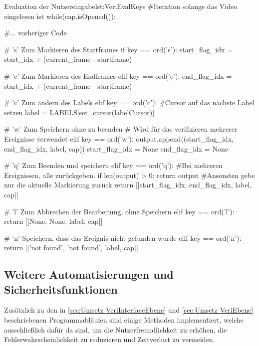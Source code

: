\begin{pythoncode}{Evaluation der Nutzereingabe}{lst:VeriEvalKeys}
#Iteration solange das Video eingelesen ist
while(cap.isOpened()):

     #... vorheriger Code
     
    # 's' Zum Markieren des Startframes
    if key == ord('s'):
        start_flag_idx = start_idx + (current_frame - startframe)
    
    # 'e' Zum Markieren des Endframes
    elif key == ord('e'):
        end_flag_idx = start_idx + (current_frame - startframe)
    
    # 'c' Zum ändern des Labels
    elif key == ord('c'):
        #Cursor auf das nächste Label setzen
        label = LABELS[set_cursor(labelCursor)]

    # 'w' Zum Speichern ohne zu beenden
    # Wird für das verifizieren mehrerer Ereignisse verwendet
    elif key == ord('w'):
        output.append((start_flag_idx, end_flag_idx, label, cap))
        start_flag_idx = None
        end_flag_idx = None
    
    # 'q' Zum Beenden und speichern
    elif key == ord('q'):
        #Bei mehreren Ereignissen, alle zurückgeben.
        if len(output) > 0:
            return output
        #Ansonsten gebe nur die aktuelle Markierung zurück
        return [[start_flag_idx, end_flag_idx, label, cap]]
    
    # 'l' Zum Abbrechen der Bearbeitung, ohne Speichern
    elif key == ord('l'):
        return [[None, None, label, cap]]
    
    # 'n' Speichern, dass das Ereignis nicht gefunden wurde
    elif key == ord('n'):
        return [['not found', 'not found', label, cap]]

\end{pythoncode}



\subsection{Weitere Automatisierungen und Sicherheitsfunktionen} \label{sec:Umsetz VeriZusatz}
Zusätzlich zu den in \autoref{sec:Umsetz VeriInterfaceEbene} und \autoref{sec:Umsetz VeriEbene} beschriebenen Programmabläufen sind einige Methoden implementiert, welche ausschließlich dafür da sind, um die Nutzerfreundlichkeit zu erhöhen, die Fehlerwahrscheinlichkeit zu reduzieren und Zeitverlust zu vermeiden. \par


